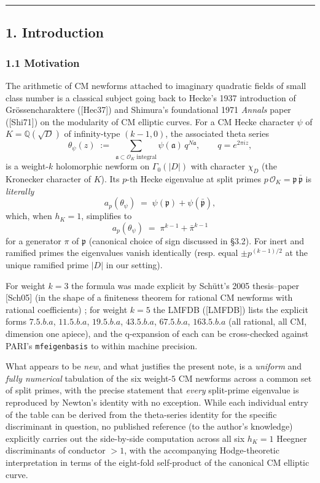 \documentclass[
  11pt,
  a4paper,
]{amsart}
\begin{document}
\begin{center}\rule{0.5\linewidth}{0.5pt}\end{center}

\hypertarget{introduction}{%
\subsection{1. Introduction}\label{introduction}}

\hypertarget{motivation}{%
\subsubsection{1.1 Motivation}\label{motivation}}

The arithmetic of CM newforms attached to imaginary quadratic fields of small class number is a classical subject going back to Hecke's 1937 introduction of Grössencharaktere ({[}Hec37{]}) and Shimura's foundational 1971 \emph{Annals} paper ({[}Shi71{]}) on the modularity of CM elliptic curves. For a CM Hecke character \(\psi\) of \(K = \mathbb{Q}(\sqrt{D})\) of infinity-type \((k - 1, 0)\), the associated theta series
\[
\theta_\psi(z) \;:=\; \sum_{\mathfrak{a} \subset \mathcal{O}_K\;\text{integral}} \psi(\mathfrak{a})\, q^{N\mathfrak{a}}, \qquad q = e^{2\pi i z},
\]
is a weight-\(k\) holomorphic newform on \(\Gamma_0(|D|)\) with character \(\chi_D\) (the Kronecker character of \(K\)). Its \(p\)-th Hecke eigenvalue at split primes \(p\,\mathcal{O}_K = \mathfrak{p}\,\bar{\mathfrak{p}}\) is \emph{literally}
\[
a_p(\theta_\psi) \;=\; \psi(\mathfrak{p}) + \psi(\bar{\mathfrak{p}}),
\]
which, when \(h_K = 1\), simplifies to
\[
a_p(\theta_\psi) \;=\; \pi^{k-1} + \bar\pi^{k-1}
\]
for a generator \(\pi\) of \(\mathfrak{p}\) (canonical choice of sign discussed in §3.2). For inert and ramified primes the eigenvalues vanish identically (resp. equal \(\pm p^{(k-1)/2}\) at the unique ramified prime \(|D|\) in our setting).

For weight \(k = 3\) the formula was made explicit by Schütt's 2005 thesis--paper {[}Sch05{]} (in the shape of a finiteness theorem for rational CM newforms with rational coefficients) ; for weight \(k = 5\) the LMFDB ({[}LMFDB{]}) lists the explicit forms \(7.5.b.a\), \(11.5.b.a\), \(19.5.b.a\), \(43.5.b.a\), \(67.5.b.a\), \(163.5.b.a\) (all rational, all CM, dimension one apiece), and the q-expansion of each can be cross-checked against PARI's \texttt{mfeigenbasis} to within machine precision.

What appears to be \emph{new}, and what justifies the present note, is a \emph{uniform} and \emph{fully numerical} tabulation of the six weight-\(5\) CM newforms across a common set of split primes, with the precise statement that \emph{every} split-prime eigenvalue is reproduced by Newton's identity with no exception. While each individual entry of the table can be derived from the theta-series identity for the specific discriminant in question, no published reference (to the author's knowledge) explicitly carries out the side-by-side computation across all six \(h_K = 1\) Heegner discriminants of conductor \(> 1\), with the accompanying Hodge-theoretic interpretation in terms of the eight-fold self-product of the canonical CM elliptic curve.
\end{document}
